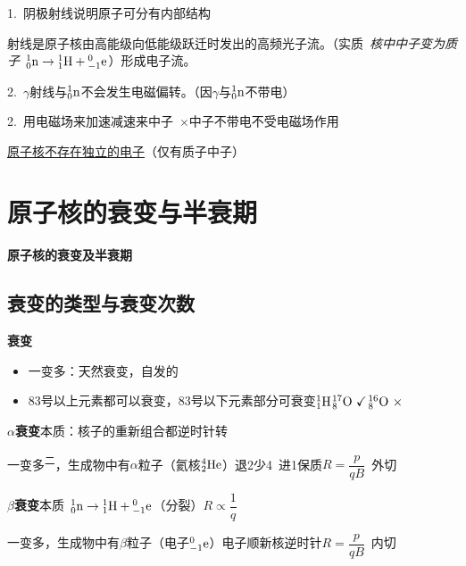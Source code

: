 1.\ 阴极射线说明原子可分有内部结构

\unclear{$\gamma$}射线是原子核由高能级向低能级跃迁时发出的高频光子流。（实质\ \textit{核中中子变为质子}\ ${}^{1}_{0}\mathrm{n}\to{}^{1}_{1}\mathrm{H}+{}^{0}_{-1}\mathrm{e}$）形成电子流。 %

2.\ $\gamma$射线与${}^{1}_{0}\mathrm{n}$不会发生电磁偏转。（因$\gamma$与${}^{1}_{0}\mathrm{n}$不带电）

2.\ 用电磁场来加速减速来中子\ $\times$\qquad 中子不带电不受电磁场作用 %

\underline{原子核不存在独立的电子}（仅有质子中子）


\section{原子核的衰变与半衰期}
\textbf{原子核的衰变及半衰期}

\subsection{衰变的类型与衰变次数}
\textbf{衰变}
\begin{itemize}
\item 一变多：天然衰变，自发的
\item 83号以上元素都可以衰变，83号以下元素部分可衰变\quad ${}^{1}_{1}\mathrm{H}$\quad ${}^{17}_{8}\mathrm{O}\ \checkmark$\quad ${}^{16}_{8}\mathrm{O}\ \times$ %
\end{itemize}

\textbf{$\alpha$衰变}\quad 本质：核子的重新组合\qquad 都逆时针转

\hspace{2em}一变多\textsuperscript{二}，生成物中有$\alpha$粒子（氦核${}^{4}_{2}\mathrm{He}$）\quad 退2少4\ 进1保质\quad $R=\dfrac{p}{qB}$\ 外切 %

\textbf{$\beta$衰变}\quad 本质\ ${}^{1}_{0}\mathrm{n}\to{}^{1}_{1}\mathrm{H}+{}^{0}_{-1}\mathrm{e}$（分裂）\qquad $R\propto\dfrac{1}{q}$ %

\hspace{2em}一变多，生成物中有$\beta$粒子（电子${}^{0}_{-1}\mathrm{e}$）\quad 电子顺新核逆时针\quad $R=\dfrac{p}{qB}$\ 内切

